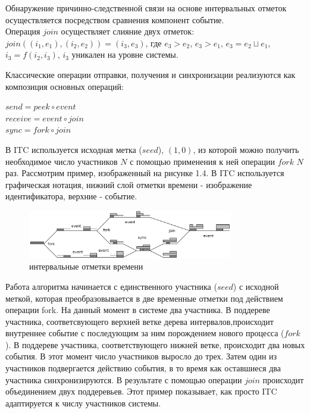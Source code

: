 Обнаружение причинно-следственной связи на основе интервальных отметок осуществляется посредством сравнения компонент событие.\\
Операция $join$ осуществляет слияние двух отметок: $join((i_1,e_1),(i_2,e_2)) = (i_3,e_3)$, где
$e_3 > e_2$, $e_3 > e_1$, $e_3 = e_2 \sqcup e_1$, $i_3 = f(i_2,i_3)$, $i_3$ уникален на уровне системы.
\par
Классические операции отправки, получения и синхронизации реализуются как композиция основных операций:
\begin{center}
$send = peek \circ event$\\
$receive = event \circ join$\\
$sync = fork \circ join$
\end{center}
В ITC используется исходная метка ($seed$), $(1,0)$, из которой можно получить необходимое число участников $N$ с помощью применения к ней операции $fork$ $N$ раз.
Рассмотрим пример, изображенный на рисунке 1.4. В ITC используется графическая нотация, нижний слой отметки времени - изображение идентификатора, верхние - событие. 
\begin{figure}
\centering
\includegraphics[width=0.8\textwidth]{img/tree.png}
\caption{интервальные отметки времени}
\end{figure}
Работа алгоритма начинается с единственного участника ($seed$) с исходной меткой, которая преобразовывается в две временные отметки под действием операции fork. На данный момент в системе два участника. В поддереве участника, соответсвующего верхней ветке дерева интервалов,происходит внутреннее событие с последующим за ним порождением нового процесса ($fork$). В поддереве участника, соответствующего нижней ветке, происходит два новых события. В этот момент число участников выросло до трех. Затем один из участников подвергается действию события, в то время как оставшиеся два участника синхронизируются. В результате с помощью операции $join$ происходит объединением двух поддеревьев. Этот пример показывает, как просто ITC адаптируется к числу участников системы.

